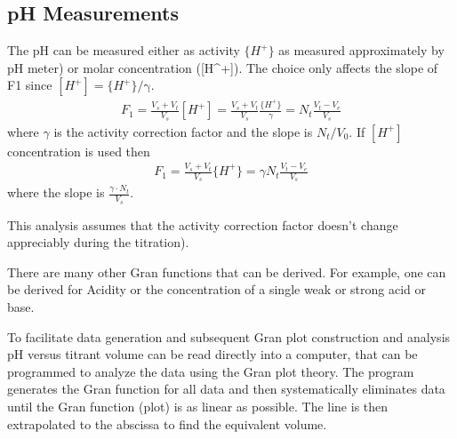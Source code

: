 \documentclass[letterpaper,10pt,english]{sphinxmanual}
\begin{document}
\subsection{pH Measurements}
\label{\detokenize{Acid_Neutralizing_Capacity/Acid_Neutralizing_Capacity:ph-measurements}}\label{\detokenize{Acid_Neutralizing_Capacity/Acid_Neutralizing_Capacity:heading-anc-ph-measurements}}
The pH can be measured either as activity \(\mathrm{\{}H^+\mathrm{\}}\) as measured approximately by pH meter) or molar concentration ({[}H\textasciicircum{}+{]}). The choice only affects the slope of F1 since \([H^+] = \mathrm{\{}H^+\mathrm{\}/\gamma}\).
\begin{equation}\label{equation:Acid_Neutralizing_Capacity/Acid_Neutralizing_Capacity:Acid_Neutralizing_Capacity/Acid_Neutralizing_Capacity:2}
\begin{split}F_1 =\frac{V_s +V_t }{V_s}  [H^+] = \frac{V_s + V_t}{V_s} \frac{\{ H^+ \} }{\gamma} = N _t \frac{V_t - V_e}{V_s}\end{split}
\end{equation}
where \(\gamma\) is the activity correction factor and the slope is \(N_t/V_0\). If \([H^+]\) concentration is used then
\begin{equation}\label{equation:Acid_Neutralizing_Capacity/Acid_Neutralizing_Capacity:Acid_Neutralizing_Capacity/Acid_Neutralizing_Capacity:3}
\begin{split}F_1 = \frac{V_s +V_t }{V_s } { \{ H}^+ {\}} = \gamma N_t \frac{V_t - V_e}{V_s}\end{split}
\end{equation}
where the slope is \(\frac{\gamma \cdot N_t}{V_s}\).

This analysis assumes that the activity correction factor doesn’t change appreciably during the titration).

There are many other Gran functions that can be derived. For example, one can be derived for Acidity or the concentration of a single weak or strong acid or base.

To facilitate data generation and subsequent Gran plot construction and analysis pH versus titrant volume can be read directly into a computer, that can be programmed to analyze the data using the Gran plot theory. The program generates the Gran function for all data and then systematically eliminates data until the Gran function (plot) is as linear as possible. The line is then extrapolated to the abscissa to find the equivalent volume.
\end{document}

